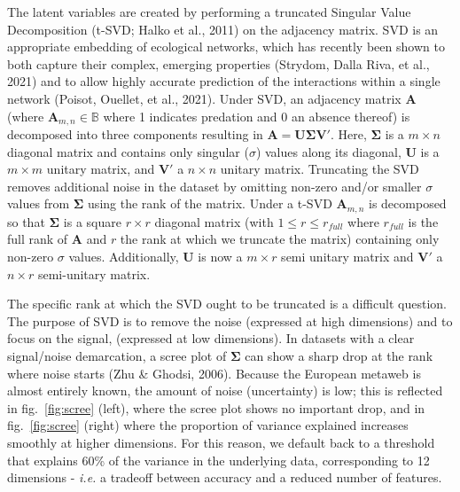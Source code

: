 \documentclass[11pt]{article}
\begin{document}
The latent variables are created by performing a truncated Singular
Value Decomposition (t-SVD; Halko et al., 2011) on the adjacency matrix.
SVD is an appropriate embedding of ecological networks, which has
recently been shown to both capture their complex, emerging properties
(Strydom, Dalla Riva, et al., 2021) and to allow highly accurate
prediction of the interactions within a single network (Poisot, Ouellet,
et al., 2021). Under SVD, an adjacency matrix \(\mathbf{A}\) (where
\(\mathbf{A}_{m,n}\in\mathbb{B}\) where 1 indicates predation and 0 an
absence thereof) is decomposed into three components resulting in
\(\mathbf{A} = \mathbf{U}\mathbf{\Sigma}\mathbf{V'}.\) Here,
\(\mathbf{\Sigma}\) is a \(m \times n\) diagonal matrix and contains
only singular (\(\sigma\)) values along its diagonal, \(\mathbf{U}\) is
a \(m \times m\) unitary matrix, and \(\mathbf{V}'\) a \(n \times n\)
unitary matrix. Truncating the SVD removes additional noise in the
dataset by omitting non-zero and/or smaller \(\sigma\) values from
\(\mathbf{\Sigma}\) using the rank of the matrix. Under a t-SVD
\(\mathbf{A}_{m,n}\) is decomposed so that \(\mathbf{\Sigma}\) is a
square \(r \times r\) diagonal matrix (with \(1 \le r \le r_{full}\)
where \(r_{full}\) is the full rank of \(\mathbf{A}\) and \(r\) the rank
at which we truncate the matrix) containing only non-zero \(\sigma\)
values. Additionally, \(\mathbf{U}\) is now a \(m \times r\) semi
unitary matrix and \(\mathbf{V}'\) a \(n \times r\) semi-unitary matrix.

The specific rank at which the SVD ought to be truncated is a difficult
question. The purpose of SVD is to remove the noise (expressed at high
dimensions) and to focus on the signal, (expressed at low dimensions).
In datasets with a clear signal/noise demarcation, a scree plot of
\(\mathbf{\Sigma}\) can show a sharp drop at the rank where noise starts
(Zhu \& Ghodsi, 2006). Because the European metaweb is almost entirely
known, the amount of noise (uncertainty) is low; this is reflected in
fig.~\ref{fig:scree} (left), where the scree plot shows no important
drop, and in fig.~\ref{fig:scree} (right) where the proportion of
variance explained increases smoothly at higher dimensions. For this
reason, we default back to a threshold that explains 60\% of the
variance in the underlying data, corresponding to 12 dimensions -
\emph{i.e.} a tradeoff between accuracy and a reduced number of
features.
\end{document}
